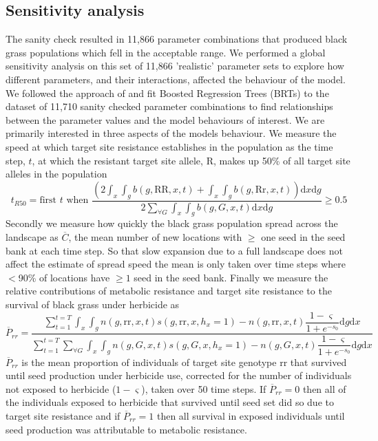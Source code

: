 \documentclass[10pt,letterpaper]{article}
\begin{document}
\subsection*{Sensitivity analysis}
The sanity check resulted in 11,866 parameter combinations that produced black grass populations which fell in the acceptable range. We performed a global sensitivity analysis on this set of 11,866 'realistic' parameter sets to explore how different parameters, and their interactions, affected the behaviour of the model. We followed the approach of \cite{Cout2014} and fit Boosted Regression Trees (BRTs) to the dataset of 11,710 sanity checked parameter combinations to find relationships between the parameter values and the model behaviours of interest. We are primarily interested in three aspects of the models behaviour. We measure the speed at which target site resistance establishes in the population as the time step, $t$, at which the resistant target site allele, R, makes up 50\% of all target site alleles in the population  
\begin{equation}\label{eq:t_R50}
	t_{R50} = \text{first } t \text{ when } \frac{\left(2\int_x\int_g b(g, \text{RR}, x, t) + \int_x\int_g b(g, \text{Rr}, x, t) \right)\text{d}x\text{d}g}{2\sum_{\forall G} \int_x\int_g b(g, G, x, t)\text{d}x\text{d}g} \geq 0.5
\end{equation}
Secondly we measure how quickly the black grass population spread across the landscape as $\overline{C}$, the mean number of new locations with $\geq$ one seed in the seed bank at each time step. So that slow expansion due to a full landscape does not affect the estimate of spread speed the mean is only taken over time steps where $<$90\% of locations have $\geq 1$ seed in the seed bank. Finally we measure the relative contributions of metabolic resistance and target site resistance to the survival of black grass under herbicide as   
\begin{equation}\label{eq:mean_pro_rr}
	\overline{P}_{rr} = \frac{\sum_{t=1}^{t=T}\int_x\int_g n(g, \text{rr}, x, t)s(g, \text{rr}, x, h_x = 1) - n(g, \text{rr}, x, t)\dfrac{1 - \varsigma}{1 + e^{-s_0}}\text{d}g\text{d}x}{\sum_{t=1}^{t=T}\sum_{\forall G}\int_x\int_g n(g, G, x, t)s(g, G, x, h_x = 1) - n(g, G, x, t)\dfrac{1 - \varsigma}{1 + e^{-s_0}}\text{d}g\text{d}x}
\end{equation} 
$\overline{P}_{rr}$ is the mean proportion of individuals of target site genotype rr that survived until seed production under herbicide use, corrected for the number of individuals not exposed to herbicide ($1 - \varsigma$), taken over 50 time steps. If $\overline{P}_{rr} = 0$ then all of the individuals exposed to herbicide that survived until seed set did so due to target site resistance and if $\overline{P}_{rr} = 1$ then all survival in exposed individuals until seed production was attributable to metabolic resistance.   
\end{document}
